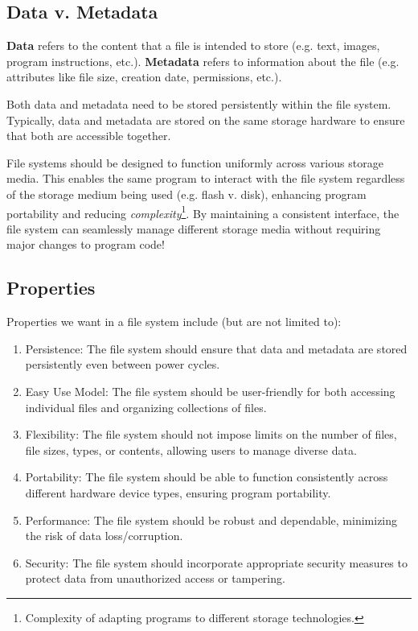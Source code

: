 \documentclass{report}
\newcommand{\definitionBegin}[1]{\begin{tcolorbox}[title={Definition: #1}]}
\newcommand{\definitionEnd}{\end{tcolorbox}}
\newcommand{\asideBegin}[1]{\begin{tcolorbox}[colback=orange!5!white,colframe=black!75!orange,title={Aside:
      #1}]}
\newcommand{\asideEnd}{\end{tcolorbox}}
\begin{document}
\subsection{Data v. Metadata}
\definitionBegin{Data and Metadata}
\textbf{Data} refers to the content that a file is intended to store (e.g. text, images, program
instructions, etc.).
\tcblower
\textbf{Metadata} refers to information about the file (e.g. attributes like file size, creation
date, permissions, etc.).
\definitionEnd

Both data and metadata need to be stored persistently within the file system. Typically, data and
metadata are stored on the same storage hardware to ensure that both are accessible together.

\asideBegin{Uniform Functionality}
File systems should be designed to function uniformly across various storage media. This enables the
same program to interact with the file system regardless of the storage medium being used
(e.g. flash v. disk), enhancing program portability and reducing
\textit{complexity}\footnote{Complexity of adapting programs to different storage technologies.}. By
maintaining a consistent interface, the file system can seamlessly manage different storage media
without requiring major changes to program code!
\asideEnd


\subsection{Properties}
Properties we want in a file system include (but are not limited to):

\begin{enumerate}[label=\textit{(\roman*)}]
\item Persistence: The file system should ensure that data and metadata are stored persistently even
  between power cycles.
\item Easy Use Model: The file system should be user-friendly for both accessing individual files
  and organizing collections of files.
\item Flexibility: The file system should not impose limits on the number of files, file sizes,
  types, or contents, allowing users to manage diverse data.
\item Portability: The file system should be able to function consistently across different hardware
  device types, ensuring program portability.
\item Performance: The file system should be robust and dependable, minimizing the risk of data loss/corruption.
\item Security: The file system should incorporate appropriate security measures to protect data
  from unauthorized access or tampering.
\end{enumerate}
\end{document}
